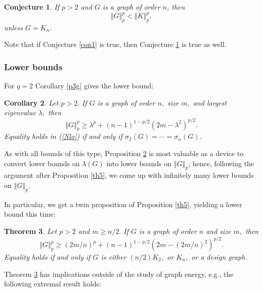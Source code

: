 \documentclass[12pt]{article}%
\newtheorem{theorem}{Theorem}[section]
\newtheorem{conjecture}[theorem]{Conjecture}
\newtheorem{corollary}[theorem]{Corollary}
\begin{document}
\begin{conjecture}
\label{con2}If $p>2$ and $G$ is a graph of order $n$, then%
\[
\left\Vert G\right\Vert _{p}^{p}<\left\Vert K\right\Vert _{p}^{p},
\]
unless $G=K_{n}.$
\end{conjecture}

Note that if Conjecture \ref{con1} is true, then Conjecture \ref{con2} is true
as well.

\subsubsection{Lower bounds}

For $q=2$ Corollary \ref{p3g} gives the lower bound:

\begin{corollary}
\label{KMlo}Let $p>2.$ If $G$ is a graph of order $n,$ size $m,$ and largest
eigenvalue $\lambda,$ then
\begin{equation}
\left\Vert G\right\Vert _{p}^{p}\geq\lambda^{p}+\left(  n-1\right)
^{1-p/2}\left(  2m-\lambda^{2}\right)  ^{p/2}. \label{Nlo}%
\end{equation}
Equality holds in (\ref{Nlo}) if and only if $\sigma_{2}\left(  G\right)
=\cdots=\sigma_{n}\left(  G\right)  .$
\end{corollary}

As with all bounds of this type, Proposition \ref{KMlo} is most valuable as a
device to convert lower bounds on $\lambda\left(  G\right)  $ into lower
bounds on $\left\Vert G\right\Vert _{p}$; hence, following the argument after
Proposition \ref{th5}, we come up with infinitely many lower bounds on
$\left\Vert G\right\Vert _{p}$.

In particular, we get a twin proposition of Proposition \ref{th5}, yielding a
lower bound this time:

\begin{theorem}
\label{Nlb}Let $p>2$ and $m\geq n/2.$ If $G$ is a graph of order $n$ and size
$m,$ then
\begin{equation}
\left\Vert G\right\Vert _{p}^{p}\geq\left(  2m/n\right)  ^{p}+\left(
n-1\right)  ^{1-p/2}\left(  2m-\left(  2m/n\right)  ^{2}\right)  ^{p/2}.
\label{Nlo1}%
\end{equation}
Equality holds if and only if $G$ is either $\left(  n/2\right)  K_{2},$ or
$K_{n},$ or a design graph.
\end{theorem}

Theorem \ref{Nlb} has implications outside of the study of graph energy, e.g.,
the following extremal result holds:
\end{document}
